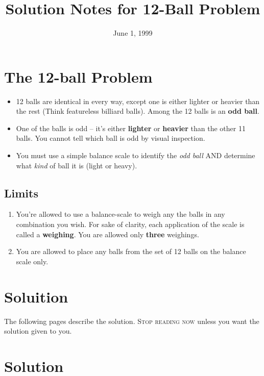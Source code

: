 \documentclass[12pt]{article}
\title{Solution Notes for 12-Ball Problem}
\date{June 1, 1999}
\begin{document}
\maketitle

\section*{The 12-ball  Problem}

\begin{itemize}
\item 12 balls are identical in every way, except one is either lighter or heavier than the rest  (Think featureless billiard balls).  Among the 12 balls is an {\textbf{odd ball}}.
\item One of the balls is odd -- it's either {\textbf{lighter}} or
{\textbf{heavier}} than the other 11 balls. You cannot tell which ball is odd
by visual inspection.  
\item You must use a simple balance scale to identify the {\textit{odd ball}} AND
determine what {\textit{kind}} of ball it is (light or heavy).

\end{itemize}

\subsection*{Limits}
\begin{enumerate}
\item You're allowed to use a balance-scale to weigh any the balls in any
 combination you wish.  For sake of clarity, each application of the scale
is called a {\textbf{weighing}}.  You are allowed only {\textbf{three}} weighings.
\item You are allowed to place any balls from the set of 12 balls on the balance scale only.
\end{enumerate}

\section*{Soluition}

The following pages describe the solution.  {\textsc{Stop reading now}} unless
you want the solution given to you.


\newpage
\section*{Solution}
\end{document}
